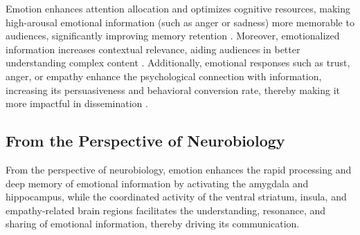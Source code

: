 Emotion enhances attention allocation and optimizes cognitive resources, making high-arousal emotional information (such as anger or sadness) more memorable to audiences, significantly improving memory retention \cite{mather2011arousal}. Moreover, emotionalized information increases contextual relevance, aiding audiences in better understanding complex content \cite{egidi2012emotional}. Additionally, emotional responses such as trust, anger, or empathy enhance the psychological connection with information, increasing its persuasiveness and behavioral conversion rate, thereby making it more impactful in dissemination \cite{berger2012makes}.



\subsection{From the Perspective of Neurobiology} %
From the perspective of neurobiology, emotion enhances the rapid processing and deep memory of emotional information by activating the amygdala and hippocampus, while the coordinated activity of the ventral striatum, insula, and empathy-related brain regions facilitates the understanding, resonance, and sharing of emotional information, thereby driving its communication.


